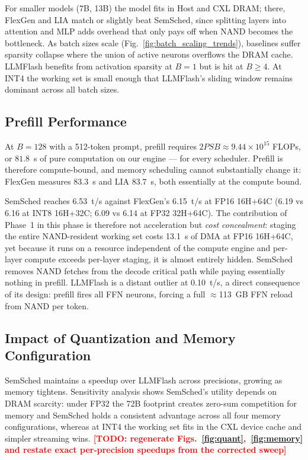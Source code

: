 \documentclass[10pt,conference,letterpaper]{IEEEtran}
\newcommand{\todo}[1]{\textcolor{red}{\textbf{[TODO: #1]}}}
\begin{document}
For smaller models (7B, 13B) the model fits in Host and CXL DRAM; there, FlexGen and LIA match or slightly beat SemSched, since splitting layers into attention and MLP adds overhead that only pays off when NAND becomes the bottleneck. As batch sizes scale (Fig.~\ref{fig:batch_scaling_trends}), baselines suffer sparsity collapse where the union of active neurons overflows the DRAM cache. LLMFlash benefits from activation sparsity at $B{=}1$ but is hit at $B\ge4$. At INT4 the working set is small enough that LLMFlash's sliding window remains dominant across all batch sizes.

\subsection{Prefill Performance}
\noindent
At $B{=}128$ with a 512-token prompt, prefill requires $2PSB \approx 9.44\times10^{15}$ FLOPs, or $81.8$~s of pure computation on our engine --- for every scheduler. Prefill is therefore compute-bound, and memory scheduling cannot substantially change it: FlexGen measures $83.3$~s and LIA $83.7$~s, both essentially at the compute bound.

SemSched reaches 6.53~t/s against FlexGen's 6.15~t/s at FP16 16H+64C (6.19 vs 6.16 at INT8 16H+32C; 6.09 vs 6.14 at FP32 32H+64C). The contribution of Phase~1 in this phase is therefore not acceleration but \emph{cost concealment}: staging the entire NAND-resident working set costs 13.1~s of DMA at FP16 16H+64C, yet because it runs on a resource independent of the compute engine and per-layer compute exceeds per-layer staging, it is almost entirely hidden. SemSched removes NAND fetches from the decode critical path while paying essentially nothing in prefill. LLMFlash is a distant outlier at 0.10~t/s, a direct consequence of its design: prefill fires all FFN neurons, forcing a full $\approx$113~GB FFN reload from NAND per token.

\subsection{Impact of Quantization and Memory Configuration}
\noindent
SemSched maintains a speedup over LLMFlash across precisions, growing as memory tightens. Sensitivity analysis shows SemSched's utility depends on DRAM scarcity: under FP32 the 72B footprint creates zero-sum competition for memory and SemSched holds a consistent advantage across all four memory configurations, whereas at INT4 the working set fits in the CXL device cache and simpler streaming wins. \todo{regenerate Figs.~\ref{fig:quant},~\ref{fig:memory} and restate exact per-precision speedups from the corrected sweep}
\end{document}
